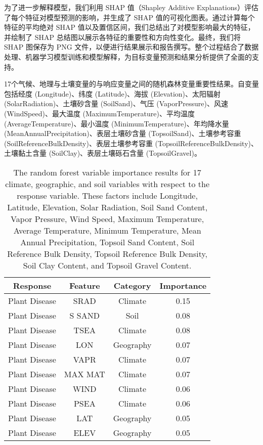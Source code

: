 \documentclass[AutoFakeBold]{LZUThesis-PgD&PhD}
\begin{document}
	为了进一步解释模型，我们利用 SHAP 值（Shapley Additive Explanations）评估了每个特征对模型预测的影响，并生成了 SHAP 值的可视化图表。通过计算每个特征的平均绝对 SHAP 值以及置信区间，我们总结出了对模型影响最大的特征，并绘制了 SHAP 总结图以展示各特征的重要性和方向性变化。最终，我们将 SHAP 图保存为 PNG 文件，以便进行结果展示和报告撰写。整个过程结合了数据处理、机器学习模型训练和模型解释，为目标变量预测和结果分析提供了全面的支持。
	
	
	
	\begin{table}[H]
		\caption{17个气候、地理与土壤变量的与响应变量之间的随机森林变量重要性结果。自变量包括经度 (Longitude)、纬度 (Latitude)、海拔 (Elevation)、太阳辐射 (SolarRadiation)、土壤砂含量 (SoilSand)、气压 (VaporPressure)、风速 (WindSpeed)、最大温度 (MaximumTemperature)、平均温度 (AverageTemperature)、最小温度 (MinimumTemperature)、年均降水量 (MeanAnnualPrecipitation)、表层土壤砂含量 (TopsoilSand)、土壤参考容重 (SoilReferenceBulkDensity)、表层土壤参考容重 (TopsoilReferenceBulkDensity)、土壤黏土含量 (SoilClay)、表层土壤砾石含量 (TopsoilGravel)。}
		\caption*{The random forest variable importance results for 17 climate, geographic, and soil variables with respect to the response variable. These factors include Longitude, Latitude, Elevation, Solar Radiation, Soil Sand Content, Vapor Pressure, Wind Speed, Maximum Temperature, Average Temperature, Minimum Temperature, Mean Annual Precipitation, Topsoil Sand Content, Soil Reference Bulk Density, Topsoil Reference Bulk Density, Soil Clay Content, and Topsoil Gravel Content.}
		\label{tab:feature_importance}
		\begin{tabular}{cccc}
			\toprule
			Response & Feature & Category & Importance \\
			\midrule
			Plant Disease & SRAD & Climate & 0.15 \\
			Plant Disease & S SAND & Soil & 0.08 \\
			Plant Disease & TSEA & Climate & 0.08 \\
			Plant Disease & LON & Geography & 0.07 \\
			Plant Disease & VAPR & Climate & 0.07 \\
			Plant Disease & MAX MAT & Climate & 0.07 \\
			Plant Disease & WIND & Climate & 0.06 \\
			Plant Disease & PSEA & Climate & 0.06 \\
			Plant Disease & LAT & Geography & 0.05 \\
			Plant Disease & ELEV & Geography & 0.05 \\

\end{tabular}
\end{table}
\end{document}
